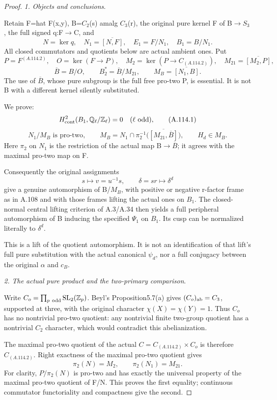 \begin{proof}
\medskip\noindent\emph{1. Objects and conclusions}.

Retain F=hat F(x,y), B=\(C_2\)(s) amalg \(C_3\)(r), the original pure kernel F of B\(\to\)\(S_3\), the full signed q:F\(\to\)C, and
\[
N=\ker q,\quad N_1=\overline{[N,F]},\quad
E_1=F/N_1,\quad B_1=B/N_1.
\]
All closed commutators and quotients below are actual ambient ones. Put
\[
P=F^{(A.114.2)},\quad O=\ker(F\to P),\quad
M_2=\ker(P\to C_{(A.114.2)}),\quad M_{21}=\overline{[M_2,P]},
\]
\[
\overline B=B/O,\qquad B_2^*=\overline B/M_{21},\qquad
M_B=\overline{[N_1,B]}.
\]
The use of \(\overline B\), whose pure subgroup is the full free pro-two P, is essential. It is not B with a different kernel silently substituted.

We prove:
\[
H^2_{\rm cont}(B_1,\mathbb Q_\ell/\mathbb Z_\ell)=0
\quad(\ell\text{ odd}),                                      \tag{A.114.1}
\]
\[
N_1/M_B\text{ is pro-two},\qquad
M_B=N_1\cap\pi_2^{-1}\bigl(\overline{[M_{21},\overline B]}\bigr),
\qquad H_d\in M_B.                                            \tag{A.114.2}
\]
Here \(\pi_2\) on \(N_1\) is the restriction of the actual map B\(\to\)\(\overline B\); it agrees with the maximal pro-two map on F.

Consequently the original assignments
\[
s\mapsto v=u^{-1}s,\qquad \delta=sr\mapsto\delta^d
\]
give a genuine automorphism of B/\(M_B\), with positive or negative r-factor frame as in A.108 and with those frames lifting the actual ones on \(B_1\). The closed-normal central lifting criterion of A.3/A.34 then yields a full peripheral automorphism of B inducing the specified \(\Psi_1\) on \(B_1\). Its cusp can be normalized literally to \(\delta^d\).

This is a lift of the quotient automorphism. It is not an identification of that lift's full pure substitution with the actual canonical \(\psi_d\), nor a full conjugacy between the original \(\alpha\) and \(c_B\).

\medskip\noindent\emph{2. The actual pure product and the two-primary comparison}.

Write \(C_o=\prod_{p\ {\rm odd}}\operatorname{SL}_2(\mathbb Z_p)\).
Beyl's Proposition5.7(a) gives \((C_o)_{\rm ab}=C_3\), supported at three, with the original character \(\chi(X)=\chi(Y)=1\). Thus \(C_o\) has no nontrivial pro-two quotient: any nontrivial finite two-group quotient has a nontrivial \(C_2\) character, which would contradict this abelianization.

The maximal pro-two quotient of the actual \(C=C_{(A.114.2)}\times C_o\) is therefore \(C_{(A.114.2)}\). Right exactness of the maximal pro-two quotient gives
\[
\pi_2(N)=M_2,\qquad \pi_2(N_1)=M_{21}.                         \tag{A.114.3}
\]
For clarity, \(P/\pi_2(N)\) is pro-two and has exactly the universal property of the maximal pro-two quotient of F/N. This proves the first equality; continuous commutator functoriality and compactness give the second.


\end{proof}
